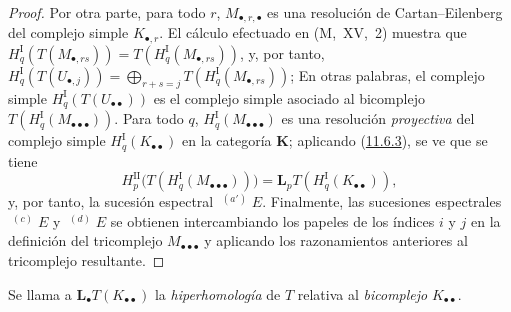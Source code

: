 \documentclass[10pt,oneside,openany]{book}
\theoremstyle{egaenv}\newtheorem*{env}{---}
\theoremstyle{egastatement}
\theoremstyle{egadescription}
\begin{document}
\begin{proof}
Por otra parte, para todo $r$, $M_{\bullet,r,\bullet}$ es una
resolución de Cartan--Eilenberg del complejo simple $K_{\bullet,r}$.
El cálculo efectuado en (M,~XV,~2) muestra que
$H_q^{\mathrm I}(T(M_{\bullet,rs}))=T(H_q^{\mathrm I}(M_{\bullet,rs}))$,
y, por tanto,
$H_q^{\mathrm I}(T(U_{\bullet,j}))=\bigoplus_{r+s=j}T(H_q^{\mathrm I}(M_{\bullet,rs}))$;
En otras palabras, el complejo simple
$H_q^{\mathrm I}(T(U_{\bullet\bullet}))$ es el complejo simple
asociado al bicomplejo
$T(H_q^{\mathrm I}(M_{\bullet\bullet\bullet}))$.
Para todo $q$, $H_q^{\mathrm I}(M_{\bullet\bullet\bullet})$ es una resolución \emph{proyectiva} del complejo simple $H_q^{\mathrm I}(K_{\bullet\bullet})$ en la categoría $\boldsymbol{K}$; aplicando (\hyperref[0.11.6.3-fr]{11.6.3}), se ve que se tiene
\[
H_p^{\mathrm{II}}
\bigl(T(H_q^{\mathrm I}(M_{\bullet\bullet\bullet}))\bigr)
=\mathbf{L}_pT(H_q^{\mathrm I}(K_{\bullet\bullet})),
\]
y, por tanto, la sucesión espectral $\mathop{}^{(a')}E$.
Finalmente, las sucesiones espectrales $\mathop{}^{(c)}E$ y
$\mathop{}^{(d)}E$ se obtienen intercambiando los papeles de los
índices $i$ y $j$ en la definición del tricomplejo
$M_{\bullet\bullet\bullet}$ y aplicando los razonamientos anteriores al
tricomplejo resultante.
\end{proof}

Se llama a $\mathbf{L}_\bullet T(K_{\bullet\bullet})$ la \emph{hiperhomología} de
$T$ relativa al \emph{bicomplejo} $K_{\bullet\bullet}$.
\end{document}
